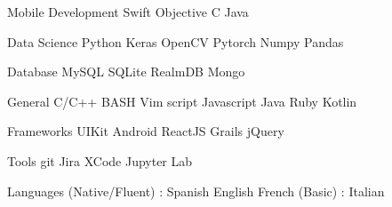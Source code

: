 \documentclass[11pt, a4paper]{resume}
\begin{document}
\begin{cvskills}

  \cvskill
    {Mobile Development}
    {Swift \textbullet{} Objective C \textbullet{} Java}

  \cvskill
    {Data Science}
    {Python \textbullet{} Keras \textbullet{} OpenCV \textbullet{} Pytorch \textbullet{} Numpy \textbullet{} Pandas}

  \cvskill
    {Database}
    {MySQL \textbullet{} SQLite \textbullet{} RealmDB \textbullet{} Mongo}

  \cvskill
    {General}
    {C/C++ \textbullet{} BASH \textbullet{} Vim script \textbullet{} Javascript \textbullet{} Java \textbullet{} Ruby \textbullet{} Kotlin}

  \cvskill
    {Frameworks}
    {UIKit \textbullet{} Android \textbullet{} ReactJS \textbullet{} Grails \textbullet{} jQuery }

  \cvskill
    {Tools}
    {git \textbullet{} Jira \textbullet{} XCode \textbullet{} Jupyter Lab}

  \cvskill
    {Languages}
    {(Native/Fluent) : Spanish  \textbullet{} English \textbullet{} French \textbullet{}  (Basic) : Italian }

\end{cvskills}



\end{document}
